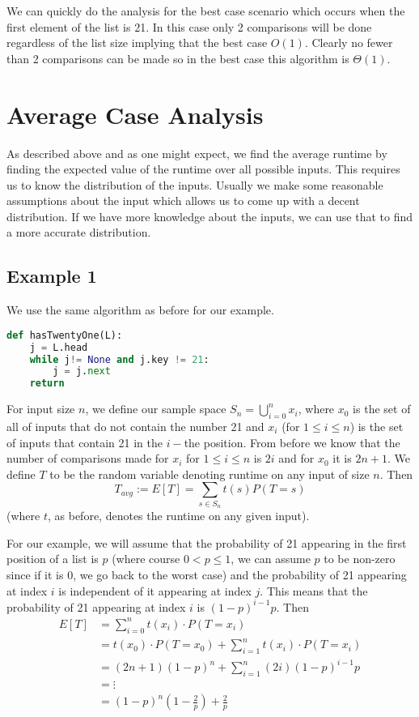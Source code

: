 We can quickly do the analysis for the best case scenario which occurs when the first element of the list is 21. In this case only 2 comparisons will be done regardless of the list size implying that the best case $O(1)$. Clearly no fewer than 2 comparisons can be made so in the best case this algorithm is $\Theta(1)$.

\section{Average Case Analysis}
As described above and as one might expect, we find the average runtime by finding the expected value of the runtime over all possible inputs. This requires us to know the distribution of the inputs. Usually we make some reasonable assumptions about the input which allows us to come up with a decent distribution. If we have more knowledge about the inputs, we can use that to find a more accurate distribution.

\subsection{Example 1}
We use the same algorithm as before for our example. 
\begin{lstlisting}[language=Python]
def hasTwentyOne(L):
    j = L.head
    while j!= None and j.key != 21:
        j = j.next
    return
\end{lstlisting}
For input size $n$, we define our sample space $S_n = \bigcup_{i = 0}^{n} x_i$, where $x_0$ is the set of all of inputs that do not contain the number 21 and $x_i$ (for $1 \leq i \leq n$) is the set of inputs that contain 21 in the $i-$the position. From before we know that the number of comparisons made for $x_i$ for $1 \leq i \leq n$ is $2i$ and for $x_0$ it is $2n + 1$. We define $T$ to be the random variable denoting runtime on any input of size $n$. Then
$$ T_{avg} := E[T] = \sum_{s \in S_n} t(s) P(T = s) $$
(where $t$, as before, denotes the runtime on any given input).

For our example, we will assume that the probability of 21 appearing in the first position of a list is $p$ (where course $0 < p \leq 1$, we can assume $p$ to be non-zero since if it is 0, we go back to the worst case) and the probability of 21 appearing at index $i$ is independent of it appearing at index $j$. This means that the probability of 21 appearing at index $i$ is $(1 - p)^{i - 1}p$. Then
\begin{align*}
    E[T] &= \sum_{i = 0}^{n} t(x_i) \cdot P(T = x_i)\\
    &= t(x_0) \cdot P(T = x_0) + \sum_{i = 1}^{n} t(x_i) \cdot P(T = x_i)\\
    &= (2n + 1)(1 - p)^{n} + \sum_{i = 1}^{n} (2i) (1 - p)^{i - 1} p\\
    &= \vdots\\
    &= (1 - p)^n \left(1 - \frac{2}{p}\right) + \frac{2}{p}
\end{align*}

